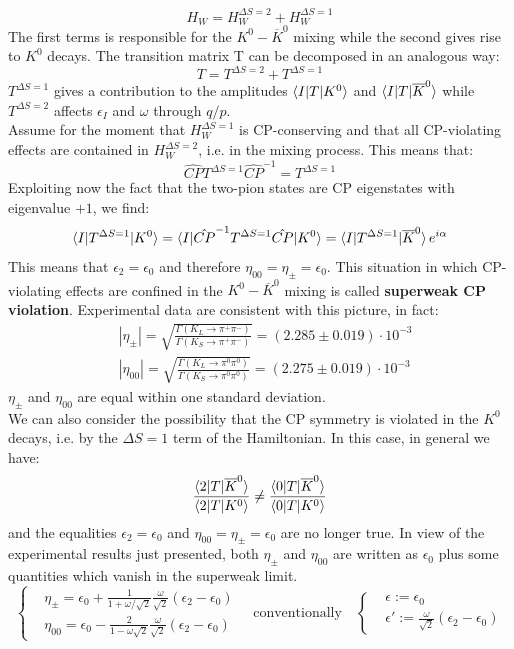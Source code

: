 \documentclass[../main.tex]{subfiles}
\begin{document}
\[
H_W=H_W^{\Delta S=2}+H_W^{\Delta S=1}
\]
The first terms is responsible for the $K^0-\overline{K}^0$ mixing while the second gives rise to $K^0$ decays. The transition matrix T can be decomposed in an analogous way:
\[
T=T^{\Delta S=2}+T^{\Delta S=1}
\]
$T^{\Delta S=1}$ gives a contribution to the amplitudes $\braket{I|T|K^0}$ and $\braket{I|T|\overline{K}^0}$ while $T^{\Delta S=2}$ affects $\epsilon_I$ and $\omega$ through $q/p$.\\
Assume for the moment that $H_W^{\Delta S=1}$ is CP-conserving and that all CP-violating effects are contained in $H_W^{\Delta S=2}$, i.e. in the mixing process. This means that:
\[
\hat{CP}T^{\Delta S=1}\hat{CP}^{-1}=T^{\Delta S=1}
\]
Exploiting now the fact that the two-pion states are CP eigenstates with eigenvalue $+1$, we find:
\[
\braket{I|T^{\Delta S=1}|K^0}=\braket{I|\hat{CP}^{-1}T^{\Delta S=1}\hat{CP}|K^0}=\braket{I|T^{\Delta S=1}|\overline{K}^0}e^{i\alpha}
\]
This means that $\epsilon_2=\epsilon_0$ and therefore $\eta_{00}=\eta_\pm=\epsilon_0$. This situation in which CP-violating effects are confined in the $K^0-\overline{K}^0$ mixing is called \textbf{superweak CP violation}. Experimental data are consistent with this picture, in fact:
\[
\begin{aligned}
&|\eta_\pm|=\sqrt{\frac{\Gamma(K_L\to\pi^+\pi^-)}{\Gamma(K_S\to\pi^+\pi^-)}}=(2.285\pm0.019)\cdot10^{-3}\\
&|\eta_{00}|=\sqrt{\frac{\Gamma(K_L\to\pi^0\pi^0)}{\Gamma(K_S\to\pi^0\pi^0)}}=(2.275\pm0.019)\cdot10^{-3}
\end{aligned}
\]
$\eta_\pm$ and $\eta_{00}$ are equal within one standard deviation.\\
We can also consider the possibility that the CP symmetry is violated in the $K^0$ decays, i.e. by the $\Delta S=1$ term of the Hamiltonian. In this case, in general we have:
\[
\frac{\braket{2|T|\overline{K}^0}}{\braket{2|T|K^0}}\neq\frac{\braket{0|T|\overline{K}^0}}{\braket{0|T|K^0}}
\]
and the equalities $\epsilon_2=\epsilon_0$ and $\eta_{00}=\eta_\pm=\epsilon_0$ are no longer true. In view of the experimental results just presented, both $\eta_\pm$ and $\eta_{00}$ are written as $\epsilon_0$ plus some quantities which vanish in the superweak limit.
\[
\left\{
\begin{aligned}
&\eta_\pm=\epsilon_0+\frac{1}{1+\omega/\sqrt{2}}\frac{\omega}{\sqrt{2}}(\epsilon_2-\epsilon_0)\\
&\eta_{00}=\epsilon_0-\frac{2}{1-\omega\sqrt{2}}\frac{\omega}{\sqrt{2}}(\epsilon_2-\epsilon_0)
\end{aligned}
\right.
\quad\text{conventionally}\quad
\left\{
\begin{aligned}
&\epsilon:=\epsilon_0\\
&\epsilon':=\frac{\omega}{\sqrt{2}}(\epsilon_2-\epsilon_0)
\end{aligned}
\right.
\]
\end{document}
